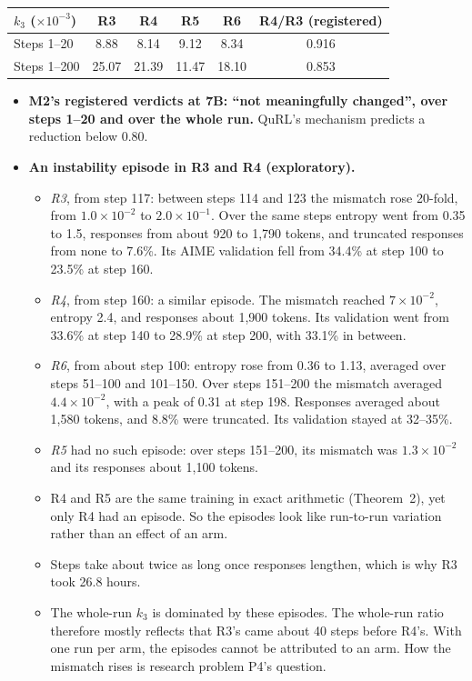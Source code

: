 \documentclass[11pt]{article}
\begin{document}
\begin{center}\small
\begin{tabular}{@{}l c c c c c@{}}
\toprule
$k_3$ ($\times10^{-3}$) & R3 & R4 & R5 & R6 & R4/R3 (registered)\\
\midrule
Steps 1--20 & 8.88 & 8.14 & 9.12 & 8.34 & 0.916\\
Steps 1--200 & 25.07 & 21.39 & 11.47 & 18.10 & 0.853\\
\bottomrule
\end{tabular}
\end{center}
\begin{itemize}
\item \textbf{M2's registered verdicts at 7B: ``not meaningfully changed'', over steps 1--20 and over the whole run.} QuRL's mechanism predicts a reduction below 0.80.
\item \textbf{An instability episode in R3 and R4 (exploratory).}
  \begin{itemize}
  \item \emph{R3}, from step 117: between steps 114 and 123 the mismatch rose 20-fold, from $1.0\times10^{-2}$ to $2.0\times10^{-1}$. Over the same steps entropy went from 0.35 to 1.5, responses from about 920 to 1{,}790 tokens, and truncated responses from none to 7.6\%. Its AIME validation fell from 34.4\% at step 100 to 23.5\% at step 160.
  \item \emph{R4}, from step 160: a similar episode. The mismatch reached $7\times10^{-2}$, entropy 2.4, and responses about 1{,}900 tokens. Its validation went from 33.6\% at step 140 to 28.9\% at step 200, with 33.1\% in between.
  \item \emph{R6}, from about step 100: entropy rose from 0.36 to 1.13, averaged over steps 51--100 and 101--150. Over steps 151--200 the mismatch averaged $4.4\times10^{-2}$, with a peak of 0.31 at step 198. Responses averaged about 1{,}580 tokens, and 8.8\% were truncated. Its validation stayed at 32--35\%.
  \item \emph{R5} had no such episode: over steps 151--200, its mismatch was $1.3\times10^{-2}$ and its responses about 1{,}100 tokens.
  \item R4 and R5 are the same training in exact arithmetic (Theorem~2), yet only R4 had an episode. So the episodes look like run-to-run variation rather than an effect of an arm.
  \item Steps take about twice as long once responses lengthen, which is why R3 took 26.8 hours.
  \item The whole-run $k_3$ is dominated by these episodes. The whole-run ratio therefore mostly reflects that R3's came about 40 steps before R4's. With one run per arm, the episodes cannot be attributed to an arm. How the mismatch rises is research problem P4's question.
  \end{itemize}
\end{itemize}
\end{document}
